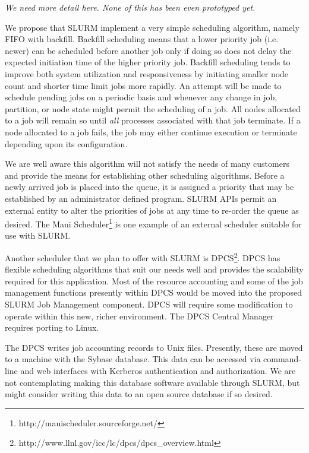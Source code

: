 {\em We need more detail here. None of this has been even prototyped yet.}

We propose that SLURM implement a very simple scheduling algorithm, 
namely FIFO with backfill. Backfill scheduling 
means that a lower priority job (i.e. newer) can be scheduled before 
another job only if doing so does not delay the expected initiation 
time of the higher priority job. Backfill scheduling tends to improve 
both system utilization and responsiveness by initiating smaller 
node count and shorter time limit jobs more rapidly. 
An attempt will be made to schedule pending jobs on a periodic basis 
and whenever any change in job, partition, or node state might permit 
the scheduling of a job. 
All nodes allocated to a job will remain so until {\em all} processes 
associated with that job terminate. 
If a node allocated to a job fails, the job may either continue 
execution or terminate depending upon its configuration. 

We are well aware this algorithm will not satisfy the needs of many 
customers and provide the means for establishing other scheduling 
algorithms. Before a newly arrived job is placed into the queue, it 
is assigned a priority that may be established by an administrator 
defined program. SLURM APIs permit an external entity to alter the 
priorities of jobs at any time to re-order the queue as desired. 
The Maui Scheduler\footnote{http://mauischeduler.sourceforge.net/} 
is one example of an external scheduler suitable for use with SLURM.

Another scheduler that we plan to offer with SLURM is 
DPCS\footnote{http://www.llnl.gov/icc/lc/dpcs/dpcs\_overview.html}. 
DPCS has flexible scheduling algorithms that suit our needs well and
provides the scalability required for this application. Most of the resource
accounting and some of the job management functions presently within DPCS would
be moved into the proposed SLURM Job Management component. 
DPCS will require some modification to operate within this new, richer
environment. The DPCS Central Manager requires porting to Linux. 

The DPCS writes job accounting records to Unix files. Presently, these are
moved to a machine with the Sybase database. This data can be accessed via
command-line and web interfaces with Kerberos authentication and authorization.
We are not contemplating making this database software available through SLURM,
but might consider writing this data to an open source database if so desired.


